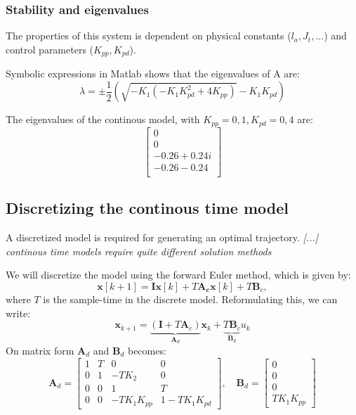 \documentclass[../main.tex]{subfiles}
\begin{document}
\subsubsection{Stability and eigenvalues}
The properties of this system is dependent on physical constants ($l_a, J_t, ...$) and control parameters ($K_{pp}, K_{pd}$).

Symbolic expressions in Matlab shows that the eigenvalues of A are:
\begin{equation}
	\lambda = \pm \frac{1}{2} \left( \sqrt{-K_1 (-K_1 K_{pd}^2 + 4  K_{pp})} - K_1  K_{pd} \right)
\end{equation}

The eigenvalues of the continous model, with $K_{pp} = 0,1 , K_{pd} = 0,4$ are:
\begin{equation}\label{eq:lab2_ss_c_eigenvalues_example}
	\begin{bmatrix}
		0 \\ 0 \\ -0.26 + 0.24i \\ -0.26 - 0.24 \\
	\end{bmatrix}
\end{equation}

\subsection{Discretizing the continous time model}
A discretized model is required for generating an optimal trajectory. \textit{[...] continous time models require quite different solution methods} \cite{FossHeirung}

We will discretize the model using the forward Euler method, which is given by:
\begin{equation}\label{eq:lab2_forward_euler}
	\bm{x}[k + 1] = \bm I \bm x[k] + T\bm{A_c x}[k] + T\bm B_c ,
\end{equation}
where $ T $ is the sample-time in the discrete model.
Reformulating this, we can write:
\begin{equation}\label{eq:lab2_discrete_system}
	\bm{x}_{k + 1} = \underbrace{(\bm I + T \bm A_c)}_{\bm A_d} \bm{x}_{k} + \underbrace{T \bm B_c}_{\bm B_d} u_k
\end{equation}
On matrix form $ \bm A_d $ and $ \bm B_d $ becomes: 
\begin{equation}
	\bm A_d = \begin{bmatrix}
		1 & T & 0 & 0 \\
		0 & 1 & -T K_2 & 0 \\
		0 & 0 & 1 & T \\
		0 & 0 & -T K_1 K_{pp} &  1 - T K_1 K_{pd}
	\end{bmatrix}, \quad 
	\bm B_d = \begin{bmatrix}
		0 \\ 0 \\ 0 \\T K_1 K_{pp}
	\end{bmatrix}
\end{equation}
\end{document}
